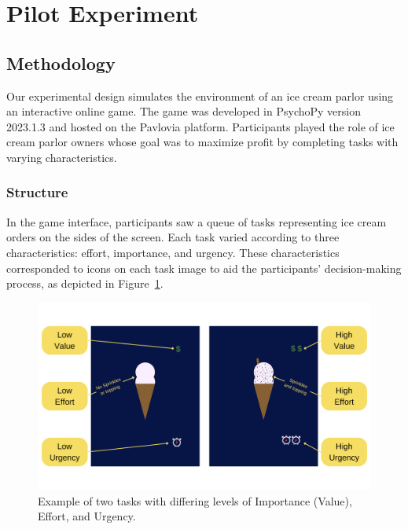 \documentclass[
]{article}
\begin{document}
\hypertarget{pilot-experiment}{%
\section{Pilot Experiment}\label{pilot-experiment}}

\hypertarget{methodology}{%
\subsection{Methodology}\label{methodology}}

Our experimental design simulates the environment of an ice cream parlor
using an interactive online game. The game was developed in PsychoPy
version 2023.1.3 and hosted on the Pavlovia platform. Participants
played the role of ice cream parlor owners whose goal was to maximize
profit by completing tasks with varying characteristics.

\hypertarget{structure}{%
\subsubsection{Structure}\label{structure}}

In the game interface, participants saw a queue of tasks representing
ice cream orders on the sides of the screen. Each task varied according
to three characteristics: effort, importance, and urgency. These
characteristics corresponded to icons on each task image to aid the
participants' decision-making process, as depicted in
Figure~\ref{fig-choice}.

\begin{figure}

{\centering \includegraphics{images/tasks_example.png}

}

\caption{\label{fig-choice}Example of two tasks with differing levels of
Importance (Value), Effort, and Urgency.}

\end{figure}
\end{document}
